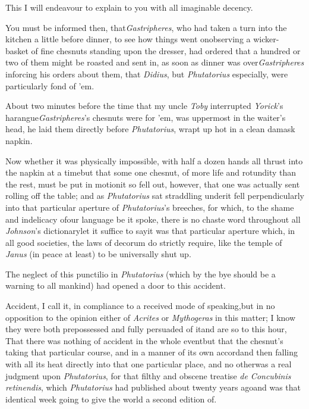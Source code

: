 \documentclass{article}
\begin{document}
This I will endeavour to explain to you with all imaginable
decency.

You must be informed then, that\break \textit{Gastripheres}, who had
taken a turn into the kitchen a little before dinner, to see how
things went on\tsk observing a wicker-
basket of fine chesnuts
standing upon the dresser, had ordered that a hundred or two of
them might be roasted and sent in, as soon as dinner was
over\tsk \textit{Gastri\-pheres} inforcing his orders about
them, that \textit{Didius}, but \textit{Phutatorius} especially, were
particularly fond of ’em.

About two minutes before the time that my uncle \textit{Toby}
interrupted \textit{Yorick}’s
harangue\tsk \textit{Gastripheres}’s chesnuts were  for ’em,
was uppermost in the waiter’s head, he laid them directly
before \textit{Phutatorius}, wrapt up hot in a clean damask
napkin.

Now whether it was physically impossible, with half a dozen
hands all thrust into the napkin at a time\tsk but that some one
chesnut, of more life and rotundity than the rest, must be put in
motion\tsk it so fell out, however, that one was\break
actually sent rolling off the table; and\break
as \textit{Phutatorius} sat straddling
under\tsk it fell perpendicularly into that particular
aperture of \textit{Phutatorius}’s breeches, for which, to the
shame and indelicacy of\break our language be it spoke, there is no
chaste word throughout all \textit{Johnson}’s
dictionary\tsk let it suffice to say\tsk it was
that particular aperture which, in all good societies, the laws of
decorum do strictly require, like the temple of \textit{Janus} (in
peace at least) to be universally shut up.

The neglect of this punctilio in \textit{Phutatorius} (which
by the bye should be a warning to all mankind) had opened a door to
this accident.\tsh{}

\tsk Accident, I call it, in compliance to a received mode of
speaking,\tsh but in no opposition to the opinion either of
\textit{Acrites} or \textit{Mythogeras} in this matter; I know they
were both prepossessed and fully persuaded of it\tsk and are so
to this hour, That there was nothing of accident in the whole
event\tsh but that the chesnut’s taking that particular course, and
in a manner of its own accord\tsk and then falling with all its
heat directly into that one particular place, and no
other\tsh was a real judgment upon \textit{Phutatorius}, for
that filthy and obscene treatise \textit{de Concubinis retinendis},
which \textit{Phutatorius} had published about twenty years
ago\tsh and was that identical week going to give the
world a second edition of.
\end{document}
